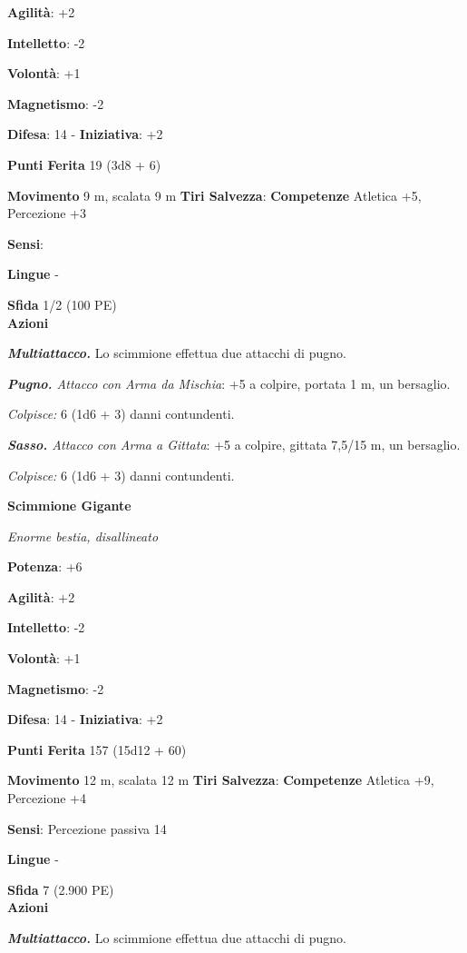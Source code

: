 \begin{multicols}{2}
\textbf{Agilità}: +2

\textbf{Intelletto}: -2

\textbf{Volontà}: +1

\textbf{Magnetismo}: -2

\textbf{Difesa}: 14 - \textbf{Iniziativa}: +2

\textbf{Punti Ferita} 19 (3d8 + 6)

\textbf{Movimento} 9 m, scalata 9 m
\textbf{Tiri Salvezza}:
\textbf{Competenze} Atletica +5, Percezione +3

\textbf{Sensi}: 

\textbf{Lingue} -

\textbf{Sfida} 1/2 (100 PE)\smallskip\\

\smallskip\textbf{Azioni}

\emph{\textbf{Multiattacco.}} Lo scimmione effettua due attacchi di
pugno.

\emph{\textbf{Pugno.} Attacco con Arma da Mischia}: +5 a colpire,
portata 1 m, un bersaglio.

\emph{Colpisce:} 6 (1d6 + 3) danni contundenti.

\emph{\textbf{Sasso.} Attacco con Arma a Gittata}: +5 a colpire, gittata
7,5/15 m, un bersaglio.

\emph{Colpisce:} 6 (1d6 + 3) danni contundenti.

\textbf{Scimmione Gigante}

\emph{Enorme bestia, disallineato}

\textbf{Potenza}: +6

\textbf{Agilità}: +2

\textbf{Intelletto}: -2

\textbf{Volontà}: +1

\textbf{Magnetismo}: -2

\textbf{Difesa}: 14 - \textbf{Iniziativa}: +2

\textbf{Punti Ferita} 157 (15d12 + 60)

\textbf{Movimento} 12 m, scalata 12 m
\textbf{Tiri Salvezza}:
\textbf{Competenze} Atletica +9, Percezione +4

\textbf{Sensi}: Percezione passiva 14

\textbf{Lingue} -

\textbf{Sfida} 7 (2.900 PE)\smallskip\\

\smallskip\textbf{Azioni}

\emph{\textbf{Multiattacco.}} Lo scimmione effettua due attacchi di
pugno.


\end{multicols}
